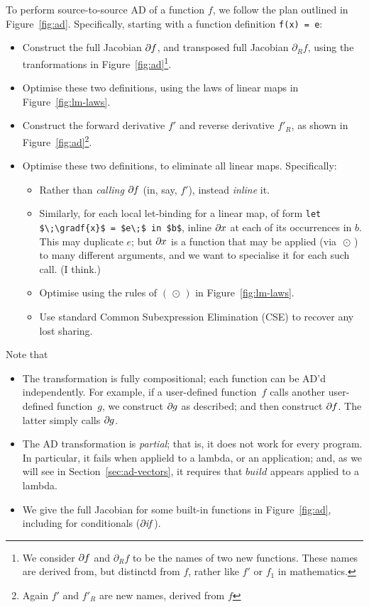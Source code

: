 \documentclass[sigplan,review]{acmart}
\newcommand{\deriv}{\partial}  %
\newcommand{\gradf}[1]{\deriv\hspace{-0.15mm} #1}  %
\newcommand{\gradft}[1]{\deriv_R#1}  %
\newcommand{\fwdDf}[1]{#1'}  %
\newcommand{\revDf}[1]{#1'_R}  %
\newcommand{\iffun}{\mathit{if}}
\newcommand{\buildfun}{\mathit{build}}
\newcommand{\lmcomp}{\,\circ\,}   %
\newcommand{\lmapply}{\,\odot\,}      %
\begin{document}
To perform source-to-source AD of a function $f$, we follow the plan
outlined in Figure~\ref{fig:ad}.  Specifically, starting with a
function definition \lstinline|f(x) = e|:

\begin{itemize}
\item Construct the full Jacobian $\gradf{f}$, and transposed full Jacobian $\gradft{f}$,
  using the tranformations in Figure~\ref{fig:ad}\footnote{
    We consider $\gradf{f}$ and $\gradft{f}$ to be the names of two new functions.
    These names are derived from, but distinctd from $f$, rather like $f'$ or $f_1$ in mathematics.
}.
\item Optimise these two definitions, using the laws of linear maps
  in Figure~\ref{fig:lm-laws}.
\item Construct the forward derivative $\fwdDf{f}$ and reverse derivative $\revDf{f}$,
  as shown in Figure~\ref{fig:ad}\footnote{Again $\fwdDf{f}$ and $\revDf{f}$ are new names, derived from $f$}.
\item Optimise these two definitions, to eliminate all linear maps. Specifically:
  \begin{itemize}
    \item Rather than \emph{calling} $\gradf{f}$ (in, say, $\fwdDf{f}$), instead \emph{inline} it.
    \item Similarly, for each local let-binding for a linear map, of form \lstinline|let $\;\gradf{x}$ = $e\;$ in $b$|,
      inline $\gradf{x}$ at each of its occurrences in $b$. This may duplicate $e$; but $\gradf{x}$ is a function
      that may be applied (via $\lmapply$) to many different arguments, and we want to specialise it for each
      such call.  (I think.)
    \item Optimise using the rules of $(\lmapply)$ in Figure~\ref{fig:lm-laws}.
    \item Use standard Common Subexpression Elimination (CSE) to recover any lost sharing.
  \end{itemize}
\end{itemize}

Note that
\begin{itemize}
\item The transformation is fully compositional; each function can be AD'd independently.
  For example, if a user-defined
  function~$f$ calls another user-defined function~$g$, we construct $\gradf{g}$ as
  described; and then construct $\gradf{f}$. The latter simply calls $\gradf{g}$.

\item The AD transformation is \emph{partial}; that is, it does not work for every
  program. In particular, it fails when applield to a lambda, or an application; and,
  as we will see in Section~\ref{sec:ad-vectors}, it requires that $\buildfun$ appears
  applied to a lambda.

\item We give the full Jacobian for some built-in functions in Figure~\ref{fig:ad}, including
  for conditionals ($\gradf{\iffun}$).
\end{itemize}
\end{document}
